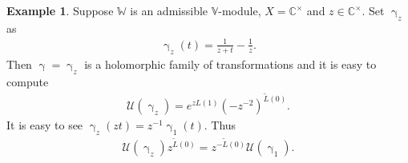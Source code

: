 \documentclass[11pt,b5paper,notitlepage]{article}
\theoremstyle{definition}
\newtheorem{eg}[df]{Example}
\theoremstyle{plain}
\newcommand{\mc}{\mathcal}
\newcommand{\wtd}{\widetilde}
\newcommand{\Vbb}{\mathbb V}
\newcommand{\Wbb}{\mathbb W}
\newcommand{\Cbb}{\mathbb C}
\newcommand{\<}{\left\langle}
\renewcommand{\>}{\right\rangle}
\newcommand{\MU}{\mathcal{U}}
\numberwithin{equation}{subsection}
\begin{document}
\begin{eg}\label{changeexample1}
    Suppose $\Wbb$ is an admissible $\Vbb$-module, $X=\Cbb^\times$ and $z\in \Cbb^\times$. Set $\upgamma_z$ as 
    \begin{align*}
        \upgamma_z(t)=\frac{1}{z+t}-\frac{1}{z}.
    \end{align*}
    Then $\upgamma=\upgamma_z$ is a holomorphic family of transformations and it is easy to compute \index{U@$\MU(\upgamma_z)$}
    \begin{align}
        \MU(\upgamma_z)=e^{zL(1)}(-z^{-2})^{\wtd L(0)}.  \label{eq40}
    \end{align}
It is easy to see $\upgamma_z(zt)=z^{-1}\upgamma_1(t)$. Thus
\begin{align}
\mc U(\upgamma_z)z^{\wtd L(0)}=z^{-\wtd L(0)}\mc U(\upgamma_1).  \label{eq43}
\end{align}
\end{eg}
\end{document}
